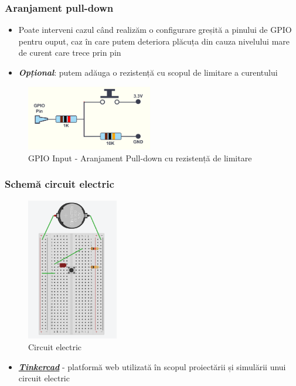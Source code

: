 \documentclass[xcolor={table}]{beamer}
\begin{document}
	\begin{frame}
	    \frametitle{Aranjament pull-down}
	    \begin{itemize}
	        \item Poate interveni cazul când realizăm o configurare greșită a pinului de GPIO pentru ouput, caz în care putem deteriora plăcuța din cauza nivelului mare de curent care trece prin pin
	        \item \textbf{\textit{Opțional}}: putem adăuga o rezistență cu scopul de limitare a curentului 
	    \end{itemize}
	    \begin{figure}
	        \centering
	        \includegraphics[width=5.5cm]{images/gpio5-limitingresistor.png}
	        \caption{GPIO Input - Aranjament Pull-down cu rezistență de limitare}
	        \label{fig:my_label}
	    \end{figure}
	\end{frame}
		\begin{frame}
	    \frametitle{Schemă circuit electric}
	    \begin{minipage}{0.35\textwidth}
	    \vspace{1cm}
	    \begin{figure}
	        \centering
	        \includegraphics[width=4cm]{images/gpio-circuit.png}
	        \caption{Circuit electric}
	        \label{fig:my_label}
	    \end{figure}
        \end{minipage}
        \begin{minipage}{0.55\textwidth}\raggedleft
        \begin{itemize}
            \item \href{https://www.tinkercad.com/}{\textbf{\textit{Tinkercad}}} - platformă web utilizată în scopul proiectării și simulării unui circuit electric
        \end{itemize}
        \end{minipage}
        \noindent
        \\
	\end{frame}
\end{document}
